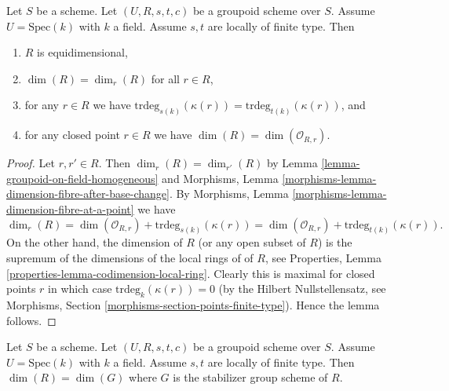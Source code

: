 \begin{lemma}
\label{lemma-groupoid-on-field-locally-finite-type-dimension}
Let $S$ be a scheme. Let $(U, R, s, t, c)$ be a groupoid scheme
over $S$. Assume $U = \text{Spec}(k)$ with $k$ a field.
Assume $s, t$ are locally of finite type.
Then
\begin{enumerate}
\item $R$ is equidimensional,
\item $\dim(R) = \dim_r(R)$ for all $r \in R$,
\item for any $r \in R$ we have
$\text{trdeg}_{s(k)}(\kappa(r)) = \text{trdeg}_{t(k)}(\kappa(r))$, and
\item for any closed point $r \in R$ we have
$\dim(R) = \dim(\mathcal{O}_{R, r})$.
\end{enumerate}
\end{lemma}

\begin{proof}
Let $r, r' \in R$.
Then $\dim_r(R) = \dim_{r'}(R)$ by
Lemma \ref{lemma-groupoid-on-field-homogeneous}
and
Morphisms, Lemma \ref{morphisms-lemma-dimension-fibre-after-base-change}.
By
Morphisms, Lemma \ref{morphisms-lemma-dimension-fibre-at-a-point}
we have
$$
\dim_r(R) =
\dim(\mathcal{O}_{R, r}) + \text{trdeg}_{s(k)}(\kappa(r)) =
\dim(\mathcal{O}_{R, r}) + \text{trdeg}_{t(k)}(\kappa(r)).
$$
On the other hand, the dimension of $R$ (or any open subset of $R$)
is the supremum of the dimensions of the local rings of of $R$, see
Properties, Lemma \ref{properties-lemma-codimension-local-ring}.
Clearly this is maximal for closed points $r$ in which case
$\text{trdeg}_{k}(\kappa(r)) = 0$ (by the Hilbert Nullstellensatz, see
Morphisms, Section \ref{morphisms-section-points-finite-type}).
Hence the lemma follows.
\end{proof}

\begin{lemma}
\label{lemma-groupoid-on-field-dimension-equal-stabilizer}
Let $S$ be a scheme. Let $(U, R, s, t, c)$ be a groupoid scheme
over $S$. Assume $U = \text{Spec}(k)$ with $k$ a field.
Assume $s, t$ are locally of finite type.
Then $\dim(R) = \dim(G)$ where $G$ is the stabilizer group scheme of $R$.
\end{lemma}


